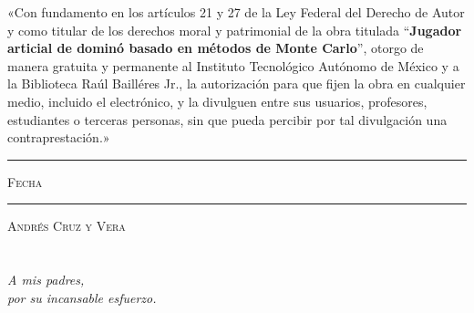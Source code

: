 \documentclass[11pt, oneside]{book}
\begin{document}

\thispagestyle{empty}

\vspace*{\fill}
\begingroup

\noindent
«Con fundamento en los artículos 21 y 27 de la Ley Federal del Derecho de Autor y como titular de los derechos moral y patrimonial de la obra titulada ``\textbf{Jugador articial de dominó basado en métodos de Monte Carlo}'', otorgo de manera gratuita y permanente al Instituto Tecnológico Autónomo de México y a la Biblioteca Raúl Bailléres Jr., la autorización para que fijen la obra en cualquier medio, incluido el electrónico, y la divulguen entre sus usuarios, profesores, estudiantes o terceras personas, sin que pueda percibir por tal divulgación una contraprestación.»


\centering

\vspace{5em}

\rule[1em]{20em}{0.5pt} %

\textsc{Fecha}

\vspace{8em}

\rule[1em]{20em}{0.5pt} %

\textsc{Andrés Cruz y Vera}

\endgroup
\vspace*{\fill}


\pagestyle{plain}
\frontmatter

\chapter*{}
\begin{flushright}
      \textit{A mis padres,\\ por su incansable esfuerzo.}
\end{flushright}

\end{document}
